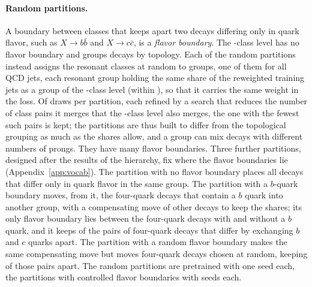 \documentclass[11pt]{article}
\newcommand{\Kcoarse}{\VocabSizeRonesixQone}
\begin{document}


\paragraph{Random partitions.}\label{sec:controls} A boundary between classes that keeps apart two
decays differing only in quark flavor, such as $X\to b\bar b$ and $X\to c\bar c$, is a
\emph{flavor boundary}. The \Kcoarse-class level has no flavor boundary and groups decays by
topology. Each of the \RandVtwoNPartitions{} random partitions instead assigns the resonant classes
at random to \Kcoarse{} groups, one of them for all QCD jets, each resonant group holding the same
share of the reweighted training jets as a group of the \Kcoarse-class level (within
\RandVtwoShareTol), so that it carries the same weight in the loss. Of \RandVtwoTrials{} draws per
partition, each refined by a search that reduces the number of class pairs it merges that the
\Kcoarse-class level also merges, the one with the fewest such pairs is kept; the partitions are
thus built to differ from the topological grouping as much as the shares allow, and a group can
mix decays with different numbers of prongs. They have many flavor boundaries. Three further
partitions, designed after the results of the hierarchy, fix where the flavor boundaries lie
(Appendix~\ref{app:vocab}). The partition with no flavor boundary places all decays that differ only
in quark flavor in the same group. The partition with a $b$-quark boundary moves, from it, the
four-quark decays \RandFlavSplitOrbit{} that contain a $b$ quark into another group, with a
compensating move of other decays to keep the shares; its only flavor boundary lies between the
four-quark decays with and without a $b$ quark, and it keeps \RandFlavFoneBcSplit{} of the
\RandFlavBcPairs{} pairs of four-quark decays that differ by exchanging $b$ and $c$ quarks apart.
The partition with a random flavor boundary makes the same compensating move but moves four-quark
decays chosen at random, keeping \RandFlavFonerBcSplit{} of those pairs apart. The random partitions
are pretrained with one seed each, the partitions with controlled flavor boundaries with
\RandFlavRuns{} seeds each.
\end{document}

